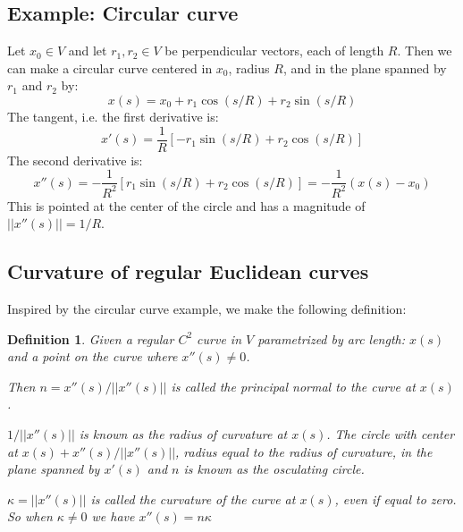 \documentclass[12pt, a4paper]{article}
\newtheorem{definition}{Definition}[section]
\numberwithin{equation}{section}
\begin{document}
\subsection{Example: Circular curve}
Let $x_0\in V$ and let $r_1,r_2\in V$ be perpendicular vectors, each of length $R$. Then we can make a circular curve centered in $x_0$, radius $R$, and in the plane spanned by $r_1$ and $r_2$ by:
\begin{equation}
x(s)=x_0+r_1\cos(s/R)+r_2\sin(s/R)
\end{equation}
The tangent, i.e. the first derivative is:
\begin{equation}
x'(s)=\frac{1}{R}[-r_1\sin(s/R)+r_2\cos(s/R)]
\end{equation}
The second derivative is:
\begin{equation}
x''(s)=-\frac{1}{R^2}[r_1\sin(s/R)+r_2\cos(s/R)]=-\frac{1}{R^2}(x(s)-x_0)
\end{equation}
This is pointed at the center of the circle and has a magnitude of $||x''(s)||=1/R$.

\subsection{Curvature of regular Euclidean curves}
Inspired by the circular curve example, we make the following definition:
\begin{definition}
Given a regular $C^2$ curve in $V$ parametrized by arc length: $x(s)$ and a point on the curve where $x''(s)\neq 0$.

Then $n=x''(s)/||x''(s)||$ is called the principal normal to the curve at $x(s)$.

$1/||x''(s)||$ is known as the radius of curvature at $x(s)$. The circle with center at $x(s)+x''(s)/||x''(s)||$, radius equal to the radius of curvature, in the plane spanned by $x'(s)$ and $n$ is known as the osculating circle.

$\kappa=||x''(s)||$ is called the curvature of the curve at $x(s)$, even if equal to zero. So when $\kappa\neq 0$ we have $x''(s)=n\kappa$
\end{definition}
\end{document}
